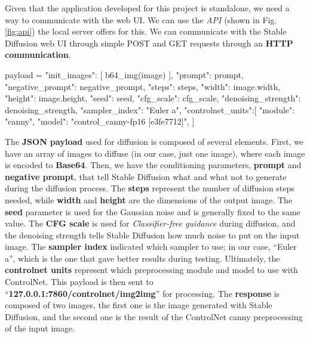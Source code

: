 \documentclass[preprint]{elsarticle}
\begin{document}
Given that the application developed for this project is standalone, 
we need a way to communicate with the web UI. We can use the \emph{API}  (shown in Fig. \ref{fig:api}) 
the local server offers for this.
We can communicate with the Stable Diffusion web UI through simple 
POST and GET requests through an \textbf{HTTP communication}. 
\begin{python}
	payload = {
		"init_images": [
		b64_img(image)
		],
		"prompt": prompt,
		"negative_prompt": negative_prompt,
		"steps": steps,
		"width": image.width,
		"height": image.height,
		"seed": seed,
		"cfg_scale": cfg_scale,
		"denoising_strength": denoising_strength,
		"sampler_index": "Euler a",
		"controlnet_units":[
		{
			"module": "canny",
			"model": "control_canny-fp16 [e3fe7712]",
		}
		]
	}
\end{python}
The \textbf{JSON payload} used for diffusion is composed of several elements.
First, we have an array of images to diffuse (in our case, just one image), 
where each image is encoded to \textbf{Base64}. 
Then, we have the conditioning parameters, \textbf{prompt} and \textbf{negative prompt}, 
that tell Stable Diffusion what and what not to generate during the diffusion process. 
The \textbf{steps} represent the number of diffusion steps needed, while \textbf{width} 
and \textbf{height} are the dimensions of the output image. 
The \textbf{seed} parameter is used for the Gaussian noise and is generally fixed to the same value. 
The \textbf{CFG scale} is used for \emph{Classifier-free guidance} during diffusion, 
and the denoising strength tells Stable Diffusion how much noise to put on the input image. 
The \textbf{sampler index} indicated which sampler to use; in our case, ``Euler a'', 
which is the one that gave better results during testing.
Ultimately, the \textbf{controlnet units} represent which preprocessing module and model to use with ControlNet.
This payload is then sent to ``\textbf{127.0.0.1:7860/controlnet/img2img}'' for processing. 
The \textbf{response} is composed of two images, the first one is the image generated with Stable Diffusion, 
and the second one is the result of the ControlNet canny preprocessing of the input image.
\end{document}
